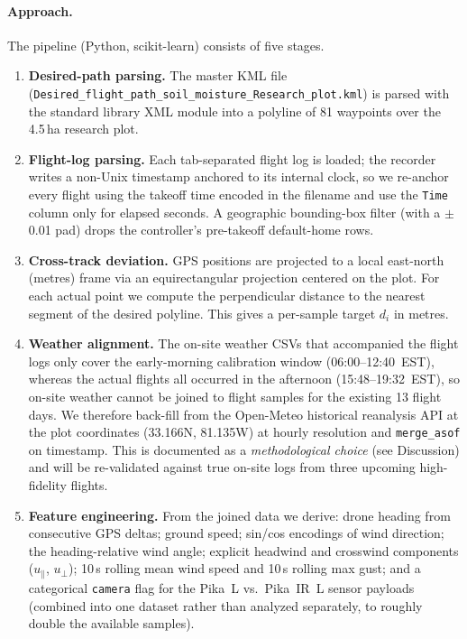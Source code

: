 \documentclass[10pt]{article}
\begin{document}
\paragraph{Approach.} The pipeline (Python, scikit-learn) consists of five stages.
\begin{enumerate}
  \item \textbf{Desired-path parsing.} The master KML file (\texttt{Desired\_flight\_path\_soil\_moisture\_Research\_plot.kml}) is parsed with the standard library XML module into a polyline of 81 waypoints over the 4.5\,ha research plot.
  \item \textbf{Flight-log parsing.} Each tab-separated flight log is loaded; the recorder writes a non-Unix timestamp anchored to its internal clock, so we re-anchor every flight using the takeoff time encoded in the filename and use the \texttt{Time} column only for elapsed seconds. A geographic bounding-box filter (with a $\pm$0.01\textdegree{} pad) drops the controller's pre-takeoff default-home rows.
  \item \textbf{Cross-track deviation.} GPS positions are projected to a local east-north (metres) frame via an equirectangular projection centered on the plot. For each actual point we compute the perpendicular distance to the nearest segment of the desired polyline. This gives a per-sample target $d_i$ in metres.
  \item \textbf{Weather alignment.} The on-site weather CSVs that accompanied the flight logs only cover the early-morning calibration window (06:00--12:40~EST), whereas the actual flights all occurred in the afternoon (15:48--19:32~EST), so on-site weather cannot be joined to flight samples for the existing 13 flight days. We therefore back-fill from the Open-Meteo historical reanalysis API at the plot coordinates (33.166\textdegree{}N, 81.135\textdegree{}W) at hourly resolution and \texttt{merge\_asof} on timestamp. This is documented as a \emph{methodological choice} (see Discussion) and will be re-validated against true on-site logs from three upcoming high-fidelity flights.
  \item \textbf{Feature engineering.} From the joined data we derive: drone heading from consecutive GPS deltas; ground speed; sin/cos encodings of wind direction; the heading-relative wind angle; explicit headwind and crosswind components ($u_\parallel$, $u_\perp$); 10\,s rolling mean wind speed and 10\,s rolling max gust; and a categorical \texttt{camera} flag for the Pika~L vs.\ Pika~IR~L sensor payloads (combined into one dataset rather than analyzed separately, to roughly double the available samples).
\end{enumerate}
\end{document}
